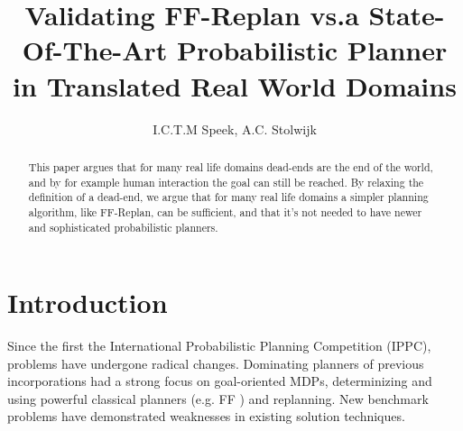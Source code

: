 \documentclass[runningheads,a4paper]{llncs}
\begin{document}
\mainmatter%

\title{Validating FF-Replan vs.\@ a State-Of-The-Art Probabilistic Planner in Translated Real World Domains}


\author{I.C.T.M Speek, A.C. Stolwijk}

%



\maketitle


\begin{abstract}
	This paper argues that for many real life domains dead-ends are the end of
	the world, and by for example human interaction the goal can still be
	reached. By relaxing the definition of a dead-end, we argue that for many
	real life domains a simpler planning algorithm, like FF-Replan, can be
	sufficient, and that it's not needed to have newer and sophisticated
	probabilistic planners.
\end{abstract}


\section{Introduction}

Since the first the International Probabilistic Planning Competition (IPPC),
problems have undergone radical changes. Dominating planners of previous
incorporations had a strong focus on goal-oriented MDPs, determinizing and
using powerful classical planners (e.g. FF \cite{Hoffmann01theff}) and
replanning. New benchmark problems have demonstrated weaknesses in existing
solution techniques.
\end{document}
